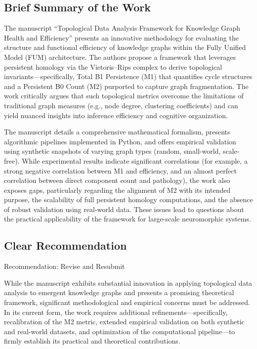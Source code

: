 \documentclass[12pt]{article}
\begin{document}
\hrulefill
\subsection{Brief Summary of the Work}

The manuscript “Topological Data Analysis Framework for Knowledge Graph Health and Efficiency” presents an innovative methodology for evaluating the structure and functional efficiency of knowledge graphs within the Fully Unified Model (FUM) architecture. The authors propose a framework that leverages persistent homology via the Vietoris–Rips complex to derive topological invariants—specifically, Total B1 Persistence (M1) that quantifies cycle structures and a Persistent B0 Count (M2) purported to capture graph fragmentation. The work critically argues that such topological metrics overcome the limitations of traditional graph measures (e.g., node degree, clustering coefficients) and can yield nuanced insights into inference efficiency and cognitive organization.

The manuscript details a comprehensive mathematical formalism, presents algorithmic pipelines implemented in Python, and offers empirical validation using synthetic snapshots of varying graph types (random, small-world, scale-free). While experimental results indicate significant correlations (for example, a strong negative correlation between M1 and efficiency, and an almost perfect correlation between direct component count and pathology), the work also exposes gaps, particularly regarding the alignment of M2 with its intended purpose, the scalability of full persistent homology computations, and the absence of robust validation using real-world data. These issues lead to questions about the practical applicability of the framework for large-scale neuromorphic systems.

\hrulefill
\subsection{Clear Recommendation}

Recommendation: Revise and Resubmit

While the manuscript exhibits substantial innovation in applying topological data analysis to emergent knowledge graphs and presents a promising theoretical framework, significant methodological and empirical concerns must be addressed. In its current form, the work requires additional refinements—specifically, recalibration of the M2 metric, extended empirical validation on both synthetic and real-world datasets, and optimization of the computational pipeline—to firmly establish its practical and theoretical contributions.
\end{document}
